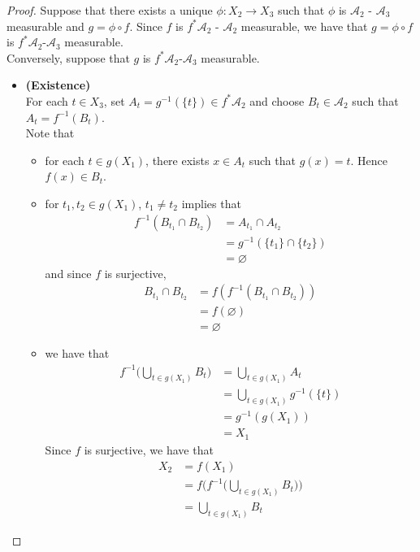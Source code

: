 \documentclass[12pt]{amsart}
\theoremstyle{definition}
\newcommand{\MA}{\mathcal{A}}
\begin{document}
	\begin{proof}
		Suppose that there exists a unique $\phi: X_2 \rightarrow X_3$ such that $\phi$ is $\MA_2$ - $\MA_3$ measurable and $g = \phi \circ f$. Since $f$ is $f^* \MA_2$ - $\MA_2$ measurable, we have that $g = \phi \circ f$ is $f^*\MA_2$-$\MA_3$ measurable.  \\
		Conversely, suppose that $g$ is $f^*\MA_2$-$\MA_3$ measurable. \\
		\begin{itemize}
			\item \textbf{(Existence)} \\
			For each $t \in X_3$, set $A_t = g^{-1}(\{t\}) \in f^* \MA_2$ and choose $B_t \in \MA_2$ such that $A_t = f^{-1}(B_t)$. \\
			Note that 
			\begin{itemize}
				\item for each $t \in g(X_1)$, there exists $x \in A_t$ such that $g(x) = t$. Hence $f(x) \in B_t$.\\
				\item for $t_1, t_2 \in g(X_1)$, $t_1 \neq t_2$ implies that
				\begin{align*}
					f^{-1}(B_{t_1} \cap B_{t_2}) 
					&= A_{t_1} \cap A_{t_2} \\
					&= g^{-1}(\{t_1\} \cap \{t_2\}) \\
					&= \varnothing
				\end{align*}	 
				and since $f$ is surjective, 
				\begin{align*}
					B_{t_1} \cap  B_{t_2} 
					& = f(f^{-1}(B_{t_1} \cap  B_{t_2} )) \\
					&= f(\varnothing) \\
					&= \varnothing
				\end{align*}
				\item we have that 
				\begin{align*}
					f^{-1} \bigg( \bigcup_{t \in g(X_1)} B_t\bigg) 
					&=  \bigcup_{t \in g(X_1)} A_t \\
					&= \bigcup_{t \in g(X_1)} g^{-1}(\{t\}) \\
					&= g^{-1}(g(X_1)) \\
					&= X_1
				\end{align*}
				Since $f$ is surjective, we have that 
				\begin{align*}
					X_2
					&= f(X_1) \\
					&= f \bigg( f^{-1} \bigg( \bigcup_{t \in g(X_1)} B_t\bigg)  \bigg) \\
					&= \bigcup_{t \in g(X_1)} B_t

\end{align*}
\end{itemize}
\end{itemize}
\end{proof}
\end{document}
